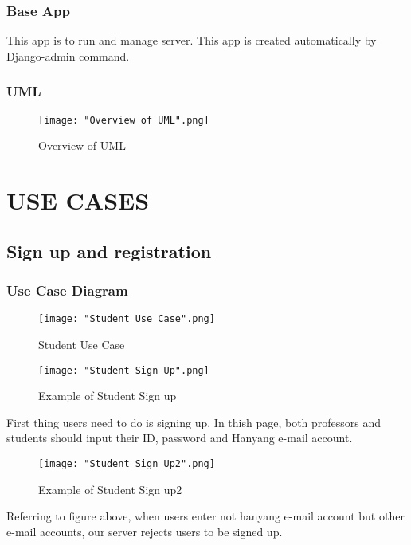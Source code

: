 \documentclass[10pt,journal,compsoc]{IEEEtran}
\begin{document}
\subsubsection{Base App}
This app is to run and manage server. This app is created automatically by Django-admin command.
\subsubsection{UML}

\begin{figure}[H]
\centering
\texttt{[image: "Overview of UML".png]}
{\caption*{Overview of UML}}
\end{figure}


\ifCLASSOPTIONcompsoc
{}
\else
\section{USE CASES}
\label{sec:USE CASES}

\subsection{Sign up and registration}
\subsubsection{Use Case Diagram}


\begin{figure}[H]
\centering
\texttt{[image: "Student Use Case".png]}
{\caption*{Student Use Case}}
\end{figure}

\fi
\begin{figure}[H]
\centering
\texttt{[image: "Student Sign Up".png]}
{\caption*{Example of Student Sign up}}
\end{figure}
First thing users need to do is signing up. In thish page, both professors and students should input their ID, password and Hanyang e-mail account.

\begin{figure}[H]
\centering
\texttt{[image: "Student Sign Up2".png]}
{\caption*{Example of Student Sign up2}}
\end{figure}
Referring to figure above, when users enter not hanyang e-mail account but other e-mail accounts, our server rejects users to be signed up. 
\end{document}
